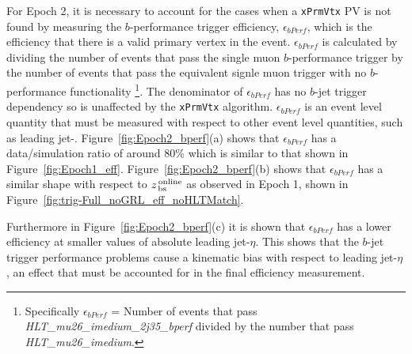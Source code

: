For Epoch 2, it is necessary to account for the cases when a \verb|xPrmVtx| PV is not found
by measuring the $b$-performance trigger efficiency, $\epsilon_{bPerf}$,
which is the efficiency that there is a valid primary vertex in the event.
$\epsilon_{bPerf}$ is calculated by dividing the number of events that pass the single muon $b$-performance trigger
by the number of events that pass the equivalent signle muon trigger with no $b$-performance functionality
\footnote{ Specifically $\epsilon_{bPerf}$ = Number of events that pass \textit{HLT\_mu26\_imedium\_2j35\_bperf} divided by the number that pass \textit{HLT\_mu26\_imedium}.}.
The denominator of $\epsilon_{bPerf}$ has no $b$-jet trigger dependency so is unaffected by the \verb|xPrmVtx| algorithm.
$\epsilon_{bPerf}$ is an event level quantity that must be measured with respect to other event level quantities, such as leading jet-\pT.
Figure~\ref{fig:Epoch2_bperf}(a) shows that $\epsilon_{bPerf}$ has a data/simulation ratio of around 80\%  which is similar to that shown in Figure~\ref{fig:Epoch1_eff}.
Figure~\ref{fig:Epoch2_bperf}(b) shows that $\epsilon_{bPerf}$ has a similar shape with respect to  $z_{\,\text{bs}}^{\text{\,online}}$ as observed in Epoch 1,
shown in Figure~\ref{fig:trig-Full_noGRL_eff_noHLTMatch}.

Furthermore in Figure~\ref{fig:Epoch2_bperf}(c) it is shown that $\epsilon_{bPerf}$ has a lower efficiency at smaller values of absolute leading jet-$\eta$.
This shows that the $b$-jet trigger performance problems cause a kinematic bias with respect to leading jet-$\eta$,
an effect that must be accounted for in the final efficiency measurement.

